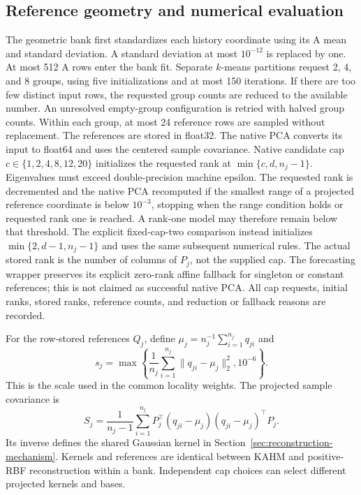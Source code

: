 \subsection{Reference geometry and numerical evaluation}

The geometric bank first standardizes each history coordinate using its
A mean and standard deviation. A standard deviation at most $10^{-12}$
is replaced by one. At most 512 A rows enter the bank fit. Separate
$k$-means partitions request 2, 4, and 8 groups, using five initializations
and at most 150 iterations. If there are too few distinct input rows,
the requested group counts are reduced to the available number. An
unresolved empty-group configuration is retried with halved group counts.
Within each group, at most 24 reference rows are sampled without
replacement. The references are stored in float32. The native PCA converts
its input to float64 and uses the centered sample covariance. Native
candidate cap $c\in\{1,2,4,8,12,20\}$ initializes the requested rank at
$\min\{c,d,n_j-1\}$. Eigenvalues must exceed double-precision machine
epsilon. The requested rank is decremented and the native PCA recomputed
if the smallest range of a projected reference coordinate is below
$10^{-3}$, stopping when the range condition holds or requested rank one
is reached. A rank-one model may therefore remain below that threshold.
The explicit fixed-cap-two comparison instead initializes
$\min\{2,d-1,n_j-1\}$ and uses the same subsequent numerical rules.
The actual stored rank is the number of columns of $P_j$, not the supplied
cap. The forecasting wrapper preserves its explicit zero-rank affine
fallback for singleton or constant references; this is not claimed as
successful native PCA. All cap requests, initial ranks, stored ranks,
reference counts, and reduction or fallback reasons are recorded.

For the row-stored references $Q_j$, define
$\mu_j=n_j^{-1}\sum_{i=1}^{n_j}q_{ji}$ and
\[
 s_j=\max\left\{\frac1{n_j}\sum_{i=1}^{n_j}
                \|q_{ji}-\mu_j\|_2^2,10^{-6}\right\}.
\]
This is the scale used in the common locality weights. The projected
sample covariance is
\[
 S_j=\frac1{n_j-1}\sum_{i=1}^{n_j}
       P_j^\top(q_{ji}-\mu_j)(q_{ji}-\mu_j)^\top P_j.
\]
Its inverse defines the shared Gaussian kernel in
Section~\ref{sec:reconstruction-mechanism}. Kernels and references are
identical between KAHM and positive-RBF reconstruction within a bank.
Independent cap choices can select different projected kernels and bases.

